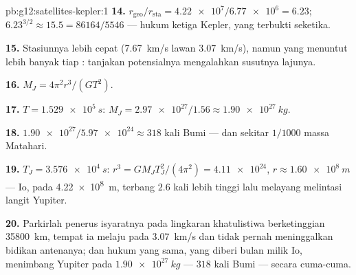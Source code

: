 \begin{solution}{pb:g12:satellites-kepler:1}
\textbf{14.} $r_{\text{geo}}/r_{\text{sta}} = \num{4.22e7}/\num{6.77e6}
= 6.23$; $6.23^{3/2} \approx 15.5 = \num{86164}/5546$ --- hukum ketiga
Kepler, yang terbukti seketika.

\textbf{15.} Stasiunnya lebih cepat (\qty{7.67}{km/s} lawan
\qty{3.07}{km/s}), namun yang  menuntut lebih banyak  tiap
: tanjakan  potensialnya mengalahkan susutnya lajunya.

\textbf{16.} $M_J = 4\pi^2 r^3/(G T^2)$.

\textbf{17.} $T = \qty{1.529e5}{s}$: $M_J =
\num{2.97e27}/1.56 \approx \qty{1.90e27}{kg}$.

\textbf{18.} $\num{1.90e27}/\num{5.97e24} \approx 318$ kali Bumi ---
dan sekitar $1/1000$ massa Matahari.

\textbf{19.} $T_J = \qty{3.576e4}{s}$: $r^3 = GM_J T_J^2/(4\pi^2) =
\num{4.11e24}$, $r \approx \qty{1.60e8}{m}$ --- Io, pada
\qty{4.22e8}{m}, terbang $2.6$ kali lebih tinggi lalu melayang melintasi
langit Yupiter.

\textbf{20.} Parkirlah penerus isyaratnya pada lingkaran khatulistiwa
berketinggian \qty{35800}{km}, tempat ia melaju pada \qty{3.07}{km/s} dan
tidak pernah meninggalkan bidikan antenanya; dan hukum yang sama, yang diberi
bulan milik Io, menimbang Yupiter pada
$\qty{1.90e27}{kg}$ --- $318$ kali Bumi --- secara cuma-cuma.
\end{solution}

